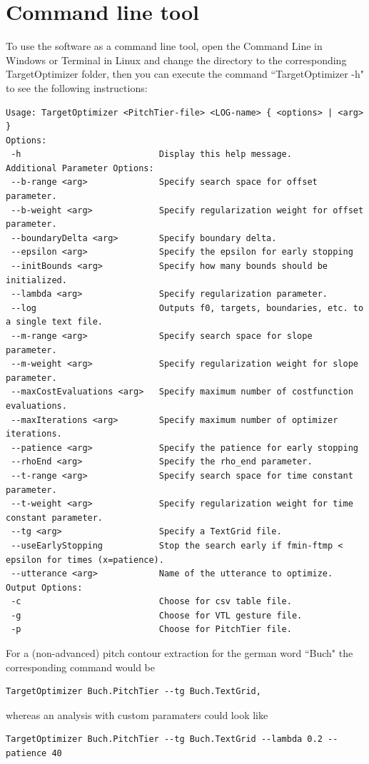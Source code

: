 \section{Command line tool}
To use the software as a command line tool, open the Command Line in Windows or Terminal in Linux and change the directory to the corresponding TargetOptimizer folder, then you can execute the command ``TargetOptimizer -h" to see the following instructions:
\begin{lstlisting}
Usage: TargetOptimizer <PitchTier-file> <LOG-name> { <options> | <arg> }
Options:
 -h                           Display this help message.
Additional Parameter Options:
 --b-range <arg>              Specify search space for offset parameter.
 --b-weight <arg>             Specify regularization weight for offset parameter.
 --boundaryDelta <arg>        Specify boundary delta.
 --epsilon <arg>              Specify the epsilon for early stopping
 --initBounds <arg>           Specify how many bounds should be initialized.
 --lambda <arg>               Specify regularization parameter.
 --log                        Outputs f0, targets, boundaries, etc. to a single text file.
 --m-range <arg>              Specify search space for slope parameter.
 --m-weight <arg>             Specify regularization weight for slope parameter.
 --maxCostEvaluations <arg>   Specify maximum number of costfunction evaluations.
 --maxIterations <arg>        Specify maximum number of optimizer iterations.
 --patience <arg>             Specify the patience for early stopping
 --rhoEnd <arg>               Specify the rho_end parameter.
 --t-range <arg>              Specify search space for time constant parameter.
 --t-weight <arg>             Specify regularization weight for time constant parameter.
 --tg <arg>                   Specify a TextGrid file.
 --useEarlyStopping           Stop the search early if fmin-ftmp < epsilon for times (x=patience).
 --utterance <arg>            Name of the utterance to optimize.
Output Options:
 -c                           Choose for csv table file.
 -g                           Choose for VTL gesture file.
 -p                           Choose for PitchTier file. 
\end{lstlisting}
For a (non-advanced) pitch contour extraction for the german word ``Buch" the corresponding command would be
\begin{lstlisting}
TargetOptimizer Buch.PitchTier --tg Buch.TextGrid,
\end{lstlisting}
whereas an analysis with custom paramaters could look like
\begin{lstlisting}
TargetOptimizer Buch.PitchTier --tg Buch.TextGrid --lambda 0.2 --patience 40
\end{lstlisting}